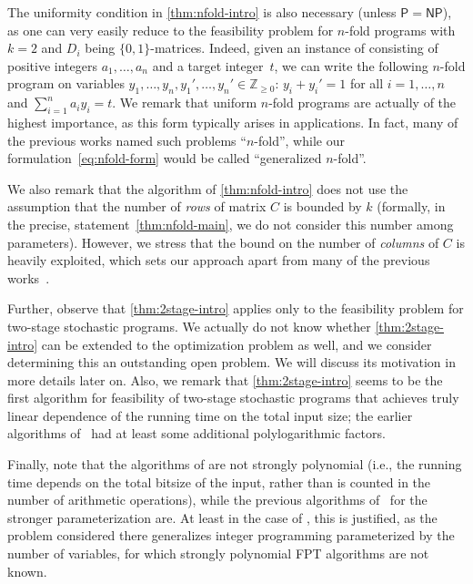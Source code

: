 \documentclass{article}
\renewcommand{\geq}{\geqslant}
\newcommand{\Z}{\mathbb{Z}}
\newcommand{\Zn}{\Z_{\geq 0}}
\begin{document}
The uniformity condition in \cref{thm:nfold-intro} is also necessary (unless $\mathsf{P}=\mathsf{NP}$), as one can very easily reduce {} to the feasibility problem for $n$-fold programs with $k=2$ and $D_i$ being $\{0,1\}$-matrices. Indeed, given an instance of {} consisting of positive integers $a_1,\ldots,a_n$ and a target integer~$t$, we can write the following $n$-fold program on variables $y_1,\ldots,y_n,y_1',\ldots,y_n'\in \Zn$: $y_i+y_i'=1$ for all $i=1,\ldots,n$ and $\sum_{i=1}^n a_i y_i=t$. We remark that uniform $n$-fold programs are actually of the highest importance, as this form typically arises in applications. In fact, many of the previous works named such problems ``$n$-fold'', while our formulation~\cref{eq:nfold-form} would be called ``generalized $n$-fold''.

We also remark that the algorithm of \cref{thm:nfold-intro} does not use the assumption that the number of {\em{rows}} of matrix $C$ is bounded by $k$ (formally, in the precise, statement~\cref{thm:nfold-main}, we do not consider this number among parameters). However, we stress that the bound on the number of {\em{columns}} of $C$ is heavily exploited, which sets our approach apart from many of the previous works~\cite{CslovjecsekEHRW21,EisenbrandHK18,KouteckyLO18}.

Further, observe that \cref{thm:2stage-intro} applies only to the feasibility problem for two-stage stochastic programs. We actually do not know whether \cref{thm:2stage-intro} can be extended to the optimization problem as well, and we consider determining this an outstanding open problem. We will discuss its motivation in more details later on. Also, we remark that \cref{thm:2stage-intro} seems to be the first algorithm for feasibility of two-stage stochastic programs that achieves truly linear dependence of the running time on the total input size; the earlier algorithms of~\cite{CslovjecsekEPVW21,KouteckyLO18} had at least some additional polylogarithmic factors.

Finally, note that the algorithms of  are not strongly polynomial (i.e., the running time depends on the total bitsize of the input, rather than is counted in the number of arithmetic operations), while the previous algorithms of~\cite{CslovjecsekEHRW21,CslovjecsekEPVW21,EisenbrandHK18,KouteckyLO18} for the stronger parameterization are. At least in the case of , this is justified, as the problem considered there generalizes integer programming parameterized by the number of variables, for which strongly polynomial FPT algorithms are not known.
\end{document}
